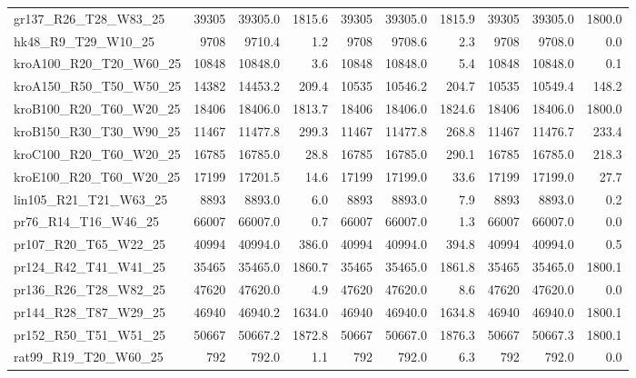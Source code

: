 \documentclass{singlecol-new}
\theoremstyle{TH}{
\newtheorem{lemma}{Lemma}
\newtheorem{theorem}[lemma]{Theorem}
\newtheorem{corrolary}[lemma]{Corrolary}
\newtheorem{conjecture}[lemma]{Conjecture}
\newtheorem{proposition}[lemma]{Proposition}
\newtheorem{claim}[lemma]{Claim}
\newtheorem{stheorem}[lemma]{Wrong Theorem}
}
\theoremstyle{THrm}{
\newtheorem{definition}{Definition}[section]
\newtheorem{question}{Question}[section]
\newtheorem{remark}{Remark}
\newtheorem{scheme}{Scheme}
}
\theoremstyle{THhit}{
\newtheorem{case}{Case}[section]
}
\begin{document}
\begin{table}[h]
{\begin{tabular}{lrrrrrrrrr}
gr137\_R26\_T28\_W83\_25    & 39305   & 39305.0   & 1815.6  & 39305   & 39305.0   & 1815.9   & 39305   & 39305.0   & 1800.0   \\
hk48\_R9\_T29\_W10\_25      & 9708    & 9710.4    & 1.2     & 9708    & 9708.6    & 2.3      & 9708    & 9708.0    & 0.0      \\
kroA100\_R20\_T20\_W60\_25  & 10848   & 10848.0   & 3.6     & 10848   & 10848.0   & 5.4      & 10848   & 10848.0   & 0.1      \\
kroA150\_R50\_T50\_W50\_25  & 14382   & 14453.2   & 209.4   & 10535   & 10546.2   & 204.7    & 10535   & 10549.4   & 148.2    \\
kroB100\_R20\_T60\_W20\_25  & 18406   & 18406.0   & 1813.7  & 18406   & 18406.0   & 1824.6   & 18406   & 18406.0   & 1800.0   \\
kroB150\_R30\_T30\_W90\_25  & 11467   & 11477.8   & 299.3   & 11467   & 11477.8   & 268.8    & 11467   & 11476.7   & 233.4    \\
kroC100\_R20\_T60\_W20\_25  & 16785   & 16785.0   & 28.8    & 16785   & 16785.0   & 290.1    & 16785   & 16785.0   & 218.3    \\
kroE100\_R20\_T60\_W20\_25  & 17199   & 17201.5   & 14.6    & 17199   & 17199.0   & 33.6     & 17199   & 17199.0   & 27.7     \\
lin105\_R21\_T21\_W63\_25   & 8893    & 8893.0    & 6.0     & 8893    & 8893.0    & 7.9      & 8893    & 8893.0    & 0.2      \\
pr76\_R14\_T16\_W46\_25     & 66007   & 66007.0   & 0.7     & 66007   & 66007.0   & 1.3      & 66007   & 66007.0   & 0.0      \\
pr107\_R20\_T65\_W22\_25    & 40994   & 40994.0   & 386.0   & 40994   & 40994.0   & 394.8    & 40994   & 40994.0   & 0.5      \\
pr124\_R42\_T41\_W41\_25    & 35465   & 35465.0   & 1860.7  & 35465   & 35465.0   & 1861.8   & 35465   & 35465.0   & 1800.1   \\
pr136\_R26\_T28\_W82\_25    & 47620   & 47620.0   & 4.9     & 47620   & 47620.0   & 8.6      & 47620   & 47620.0   & 0.0      \\
pr144\_R28\_T87\_W29\_25    & 46940   & 46940.2   & 1634.0  & 46940   & 46940.0   & 1634.8   & 46940   & 46940.0   & 1800.1   \\
pr152\_R50\_T51\_W51\_25    & 50667   & 50667.2   & 1872.8  & 50667   & 50667.0   & 1876.3   & 50667   & 50667.3   & 1800.1   \\
rat99\_R19\_T20\_W60\_25    & 792     & 792.0     & 1.1     & 792     & 792.0     & 6.3      & 792     & 792.0     & 0.0      \\

\end{tabular}}
\end{table}
\end{document}
